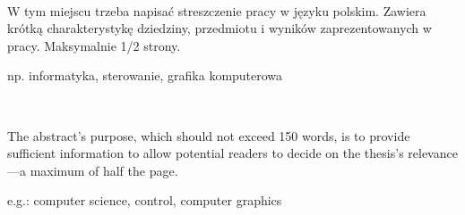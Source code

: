 %


\begin{center}
\\[1cm] 
\end{center}

W tym miejscu trzeba napisać streszczenie pracy w języku polskim. Zawiera krótką charakterystykę dziedziny, przedmiotu i wyników zaprezentowanych w pracy. Maksymalnie 1/2 strony.

\vspace{10pt}
 np. informatyka, sterowanie, grafika komputerowa

\vfill

\begin{center}
\\[1cm] 
\end{center}
The abstract's purpose, which should not exceed 150 words, is to provide sufficient information to allow potential readers to decide on the thesis's relevance—a maximum of half the page.

\vspace{10pt}
 e.g.: computer science, control, computer graphics